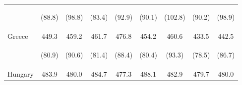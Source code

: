 \begin{center}
\begin{tabular}{lcccccccc}
 & \begin{footnotesize}(88.8)\end{footnotesize} & \begin{footnotesize}(98.8)\end{footnotesize} & \begin{footnotesize}(83.4)\end{footnotesize} & \begin{footnotesize}(92.9)\end{footnotesize} & \begin{footnotesize}(90.1)\end{footnotesize} & \begin{footnotesize}(102.8)\end{footnotesize} & \begin{footnotesize}(90.2)\end{footnotesize} & \begin{footnotesize}(98.9)\end{footnotesize}\\
\noalign{\smallskip}Greece & 449.3 & 459.2 & 461.7 & 476.8 & 454.2 & 460.6 & 433.5 & 442.5\\
 & \begin{footnotesize}(80.9)\end{footnotesize} & \begin{footnotesize}(90.6)\end{footnotesize} & \begin{footnotesize}(81.4)\end{footnotesize} & \begin{footnotesize}(88.4)\end{footnotesize} & \begin{footnotesize}(80.4)\end{footnotesize} & \begin{footnotesize}(93.3)\end{footnotesize} & \begin{footnotesize}(78.5)\end{footnotesize} & \begin{footnotesize}(86.7)\end{footnotesize}\\
\noalign{\smallskip}Hungary & 483.9 & 480.0 & 484.7 & 477.3 & 488.1 & 482.9 & 479.7 & 480.0\\

\end{tabular}
\end{center}
